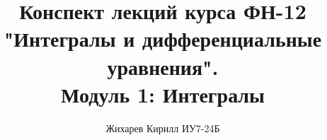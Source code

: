 \documentclass[a4paper]{article}
\title{Конспект лекций курса ФН-12 "Интегралы и дифференциальные уравнения". \\ Модуль 1: Интегралы}
\author{Жихарев Кирилл ИУ7-24Б}
\date{ }
\begin{document}
  \maketitle
  \pagebreak

  \tableofcontents
  \pagebreak

  
  
\end{document}
